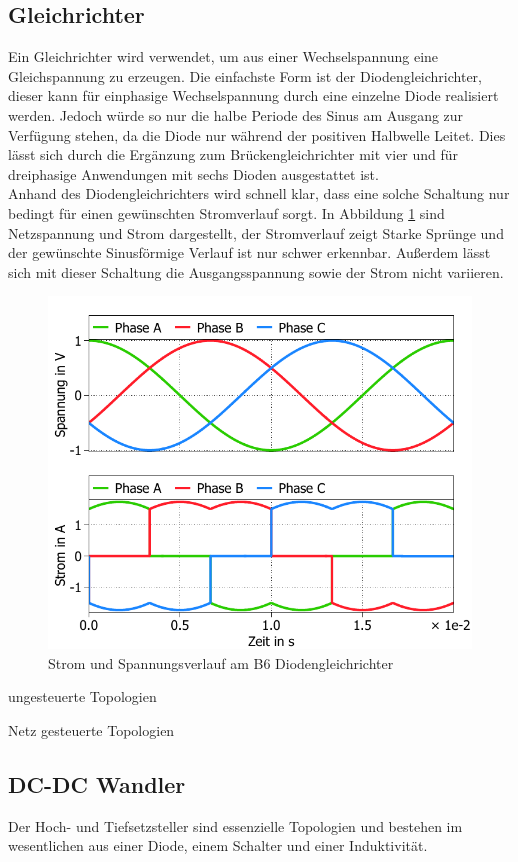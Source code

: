 \subsection{Gleichrichter}
Ein Gleichrichter wird verwendet, um aus einer Wechselspannung eine Gleichspannung zu erzeugen. Die einfachste Form ist der Diodengleichrichter, dieser kann für einphasige Wechselspannung durch eine einzelne Diode realisiert werden. Jedoch würde so nur die halbe Periode des Sinus am Ausgang zur Verfügung stehen, da die Diode nur während der positiven Halbwelle Leitet. Dies lässt sich durch die Ergänzung zum Brückengleichrichter mit vier und für dreiphasige Anwendungen mit sechs Dioden ausgestattet ist.\\
Anhand des Diodengleichrichters wird schnell klar, dass eine solche Schaltung nur bedingt für einen gewünschten Stromverlauf sorgt. In Abbildung \ref{B6DiodRect} sind Netzspannung und Strom dargestellt, der Stromverlauf zeigt Starke Sprünge und der gewünschte Sinusförmige Verlauf ist nur schwer erkennbar. Außerdem lässt sich mit dieser Schaltung die Ausgangsspannung sowie der Strom nicht variieren.
\begin{figure}
	\centering
	\includegraphics[width=0.7\linewidth]{content/Grafiken/B6-Diodengleichrichter-Eingangsverlauf}
	\caption{Strom und Spannungsverlauf am B6 Diodengleichrichter}
	\label{B6DiodRect}
\end{figure}



ungesteuerte Topologien

Netz gesteuerte Topologien

\subsection{DC-DC Wandler}
Der Hoch- und Tiefsetzsteller sind essenzielle Topologien und bestehen im wesentlichen aus einer Diode, einem Schalter und einer Induktivität. 
	
